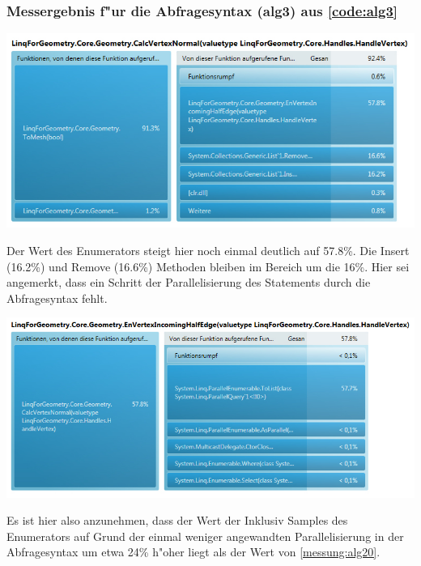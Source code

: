 \documentclass[pagesize, paper=a4, fontsize=12pt,titlepage=true, headings=small, headnosepline, abstractoff, liststotoc, nochapterprefix, plainheadsepline]{scrreprt}
\begin{document}
\subsubsection{Messergebnis f"ur die Abfragesyntax (alg3) aus \ref{code:alg3}}
\begin{minipage}[c][9.5cm]{\linewidth}
\includegraphics[width=\linewidth]{../Messung/linq-alg3-0}
\label{messung:alg30}
\end{minipage}

Der Wert des Enumerators steigt hier noch einmal deutlich auf 57.8\%. Die Insert (16.2\%) und Remove (16.6\%) Methoden bleiben im Bereich um die 16\%. Hier sei angemerkt, dass ein Schritt der Parallelisierung des Statements durch die Abfragesyntax fehlt.
\begin{minipage}[c][10cm]{\linewidth}
\includegraphics[width=\linewidth]{../Messung/linq-alg3-1}
\label{messung:alg31}
\end{minipage}

Es ist hier also anzunehmen, dass der Wert der Inklusiv Samples des Enumerators auf Grund der einmal weniger angewandten Parallelisierung in der Abfragesyntax um etwa 24\% h"oher liegt als der Wert von \ref{messung:alg20}.
\newline
\end{document}
